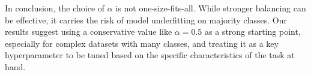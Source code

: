 In conclusion, the choice of \(\alpha\) is not one-size-fits-all. While stronger balancing can be effective, it carries the risk of model underfitting on majority classes. Our results suggest using a conservative value like \(\alpha=0.5\) as a strong starting point, especially for complex datasets with many classes, and treating it as a key hyperparameter to be tuned based on the specific characteristics of the task at hand.


